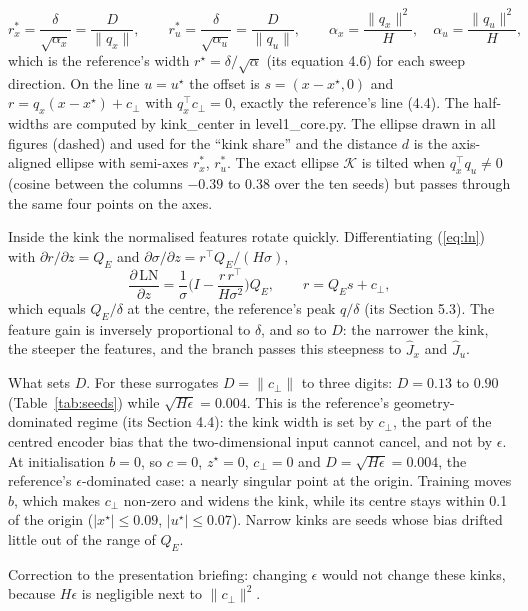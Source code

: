 \documentclass[11pt]{article}
\begin{document}
\begin{equation}
r^*_x = \frac{\delta}{\sqrt{\alpha_x}} = \frac{D}{\|q_x\|},\qquad r^*_u = \frac{\delta}{\sqrt{\alpha_u}} = \frac{D}{\|q_u\|},\qquad \alpha_x = \frac{\|q_x\|^2}{H},\quad \alpha_u = \frac{\|q_u\|^2}{H},
\end{equation}
which is the reference's width $r^\star=\delta/\sqrt\alpha$ (its equation 4.6) for each sweep direction. On the line $u=u^\star$ the offset is $s=(x-x^\star,0)$ and $r = q_x(x-x^\star) + c_\perp$ with $q_x^\top c_\perp=0$, exactly the reference's line (4.4). The half-widths are computed by kink\_center in level1\_core.py. The ellipse drawn in all figures (dashed) and used for the ``kink share'' and the distance $d$ is the axis-aligned ellipse with semi-axes $r^*_x$, $r^*_u$. The exact ellipse $\mathcal K$ is tilted when $q_x^\top q_u\neq0$ (cosine between the columns $-0.39$ to $0.38$ over the ten seeds) but passes through the same four points on the axes.

Inside the kink the normalised features rotate quickly. Differentiating (\ref{eq:ln}) with $\partial r/\partial z = Q_E$ and $\partial\sigma/\partial z = r^\top Q_E/(H\sigma)$,
\begin{equation}
\frac{\partial\,\mathrm{LN}}{\partial z} = \frac{1}{\sigma}\Big(I-\frac{r\,r^\top}{H\sigma^2}\Big)Q_E,\qquad r = Q_E s + c_\perp ,
\end{equation}
which equals $Q_E/\delta$ at the centre, the reference's peak $q/\delta$ (its Section 5.3). The feature gain is inversely proportional to $\delta$, and so to $D$: the narrower the kink, the steeper the features, and the branch passes this steepness to $\hat J_x$ and $\hat J_u$.

What sets $D$. For these surrogates $D=\|c_\perp\|$ to three digits: $D=0.13$ to $0.90$ (Table~\ref{tab:seeds}) while $\sqrt{H\epsilon}=0.004$. This is the reference's geometry-dominated regime (its Section 4.4): the kink width is set by $c_\perp$, the part of the centred encoder bias that the two-dimensional input cannot cancel, and not by $\epsilon$. At initialisation $b=0$, so $c=0$, $z^\star=0$, $c_\perp=0$ and $D=\sqrt{H\epsilon}=0.004$, the reference's $\epsilon$-dominated case: a nearly singular point at the origin. Training moves $b$, which makes $c_\perp$ non-zero and widens the kink, while its centre stays within 0.1 of the origin ($|x^\star|\le0.09$, $|u^\star|\le0.07$). Narrow kinks are seeds whose bias drifted little out of the range of $Q_E$.

Correction to the presentation briefing: changing $\epsilon$ would not change these kinks, because $H\epsilon$ is negligible next to $\|c_\perp\|^2$.
\end{document}

